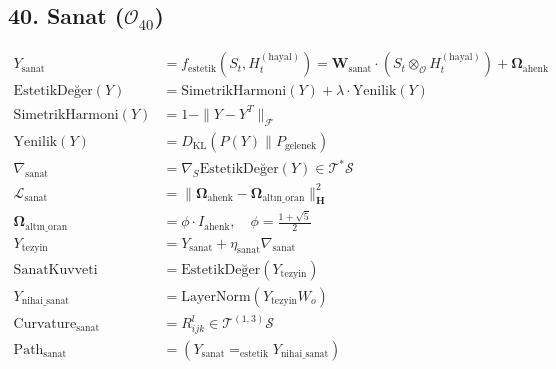 \documentclass[11pt, a4paper]{article}
\begin{document}
\subsection{40. Sanat ($\mathcal{O}_{40}$)}
\begin{align}
Y_{\text{sanat}} &= f_{\text{estetik}}(S_t, H_t^{(\text{hayal})}) = \mathbf{W}_{\text{sanat}} \cdot \left( S_t \otimes_{\mathcal{O}} H_t^{(\text{hayal})} \right) + \mathbf{\Omega}_{\text{ahenk}} \\
\text{EstetikDeğer}(Y) &= \text{SimetrikHarmoni}(Y) + \lambda \cdot \text{Yenilik}(Y) \\
\text{SimetrikHarmoni}(Y) &= 1 - \| Y - Y^T \|_{\mathcal{F}} \\
\text{Yenilik}(Y) &= D_{\text{KL}}(P(Y) \parallel P_{\text{gelenek}}) \\
\nabla_{\text{sanat}} &= \nabla_S \text{EstetikDeğer}(Y) \in \mathcal{T}^*\mathcal{S} \\
\mathcal{L}_{\text{sanat}} &= \|\mathbf{\Omega}_{\text{ahenk}} - \mathbf{\Omega}_{\text{altın\_oran}}\|_{\mathbf{H}}^2 \\
\mathbf{\Omega}_{\text{altın\_oran}} &= \phi \cdot I_{\text{ahenk}}, \quad \phi = \frac{1+\sqrt{5}}{2} \\
Y_{\text{tezyin}} &= Y_{\text{sanat}} + \eta_{\text{sanat}} \nabla_{\text{sanat}} \\
\text{SanatKuvveti} &= \text{EstetikDeğer}(Y_{\text{tezyin}}) \\
Y_{\text{nihai\_sanat}} &= \text{LayerNorm}(Y_{\text{tezyin}} W_o) \\
\text{Curvature}_{\text{sanat}} &= R_{ijk}^l \in \mathcal{T}^{(1,3)}\mathcal{S} \\
\text{Path}_{\text{sanat}} &= (Y_{\text{sanat}} =_{\text{estetik}} Y_{\text{nihai\_sanat}})
\end{align}
\end{document}
